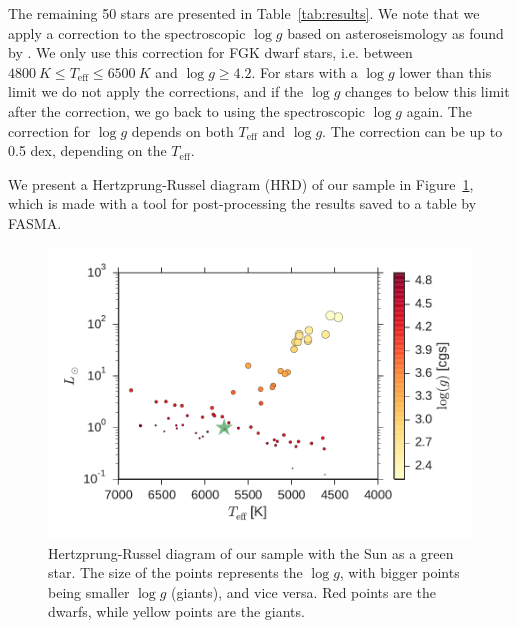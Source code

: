 \documentclass{aa}
\begin{document}
The remaining 50 stars are presented in Table~\ref{tab:results}. We note that we
apply a correction to the spectroscopic $\log g$ based on asteroseismology as
found by \citet{Mortier2014}. We only use this correction for FGK dwarf stars,
i.e. between $\SI{4800}{K}\leq T_\mathrm{eff} \leq \SI{6500}{K}$ and $\log
g\geq4.2$. For stars with a $\log g$ lower than this limit we do not apply the
corrections, and if the $\log g$ changes to below this limit after the
correction, we go back to using the spectroscopic $\log g$ again. The correction
for $\log g$ depends on both $T_\mathrm{eff}$ and $\log g$. The correction can
be up to 0.5 dex, depending on the $T_\mathrm{eff}$.

We present a Hertzprung-Russel diagram (HRD) of our sample in
Figure~\ref{fig:HRD}, which is made with a tool for post-processing the results
saved to a table by FASMA.

\begin{figure}[tpb]
    \centering
    \includegraphics[width=1.0\linewidth,natwidth=440,natheight=290]{figures/HR.pdf}
    \caption{Hertzprung-Russel diagram of our sample with the Sun as a green
    star. The size of the points represents the $\log g$, with bigger points
    being smaller $\log g$ (giants), and vice versa. Red points are the dwarfs, while yellow points are the
    giants.}
    \label{fig:HRD}
\end{figure}
\end{document}
